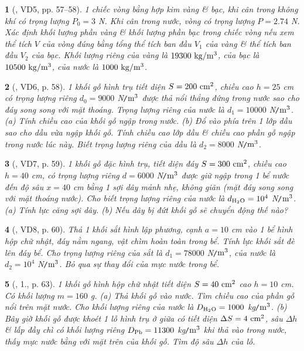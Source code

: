 \documentclass{article}
\newtheorem{baitoan}{}
\begin{document}
\begin{baitoan}[\cite{Van_Quyen_Hanh_Nhu_10_chuyen_Ly}, VD5, pp. 57--58]
	1 chiếc vòng bằng hợp kim vàng \& bạc, khi cân trong không khí có trọng lượng $P_0 = 3$ {\rm N}. Khi cân trong nước, vòng có trọng lượng $P = 2.74$ {\rm N}. Xác định khối lượng phần vàng \& khối lượng phần bạc trong chiếc vòng nếu xem thể tích $V$ của vòng đúng bằng tổng thể tích ban đầu $V_1$ của vàng \& thể tích ban đầu $V_2$ của bạc. Khối lượng riêng của vàng là $\rm19300\ kg{\tt/}m^3$, của bạc là $\rm10500\ kg{\tt/}m^3$, của nước là $\rm1000\ kg{\tt/}m^3$.
\end{baitoan}

\begin{baitoan}[\cite{Van_Quyen_Hanh_Nhu_10_chuyen_Ly}, VD6, p. 58]
	1 khối gỗ hình trụ tiết diện $S = 200\ {\rm cm^2}$, chiều cao $h = 25$ {\rm cm} có trọng lượng riêng $d_0 = 9000$ {\rm N{\tt/}$\rm m^3$} được thả nổi thẳng đứng trong nước sao cho đáy song song với mặt thoáng. Trọng lượng riêng của nước là $d_1 = 10000$ {\rm N{\tt/}$\rm m^3$}. (a) Tính chiều cao của khối gỗ ngập trong nước. (b) Đổ vào phía trên 1 lớp dầu sao cho dầu vừa ngập khối gỗ. Tính chiều cao lớp dầu \& chiều cao phần gỗ ngập trong nước lúc này. Biết trọng lượng riêng của dầu là $d_2 = 8000$ {\rm N{\tt/}$\rm m^3$}.
\end{baitoan}

\begin{baitoan}[\cite{Van_Quyen_Hanh_Nhu_10_chuyen_Ly}, VD7, p. 59]
	1 khối gỗ đặc hình trụ, tiết diện đáy $S = 300\ {\rm cm^2}$, chiều cao $h = 40$ {\rm cm}, có trọng lượng riêng $d = 6000$ {\rm N{\tt/}$\rm m^3$} được giữ ngập trong 1 bể nước đến độ sâu $x = 40$ {\rm cm} bằng 1 sợi dây mảnh nhẹ, không giãn (mặt đáy song song với mặt thoáng nước). Cho biết trọng lượng riêng của nước là $d_{\rm H_2O} = 10^4$ {\rm N{\tt/}$\rm m^3$}. (a) Tính lực căng sợi dây. (b) Nếu dây bị đứt khối gỗ sẽ chuyển động thế nào?
\end{baitoan}

\begin{baitoan}[\cite{Van_Quyen_Hanh_Nhu_10_chuyen_Ly}, VD8, p. 60]
	Thả 1 khối sắt hình lập phương, cạnh $a = 10$ {\rm cm} vào 1 bể hình hộp chữ nhật, đáy nằm ngang, vật chìm hoàn toàn trong bể. Tính lực khối sắt đè lên đáy bể. Cho trọng lượng riêng của sắt là $d_1 = 78000$ {\rm N{\tt/}$\rm m^3$}, của nước là $d_2 = 10^4$ {\rm N{\tt/}$\rm m^3$}. Bỏ qua sự thay đổi của mực nước trong bể.
\end{baitoan}

\begin{baitoan}[\cite{Van_Quyen_Hanh_Nhu_10_chuyen_Ly}, 1., p. 63]
	1 khối gỗ hình hộp chữ nhật tiết diện $S = 40\ {\rm cm}^2$ cao $h = 10$ {\rm cm}. Có khối lượng $m = 160$ {\rm g}. (a) Thả khối gỗ vào nước. Tìm chiều cao của phần gỗ nổi trên mặt nước. Cho khối lượng riêng của nước là $D_{\rm H_2O} = 1000$ {\rm kg{\tt/}$\rm m^3$}. (b) Bây giờ khối gỗ được khoét 1 lỗ hình trụ ở giữa có tiết diện $\Delta S = 4\ {\rm cm}^2$, sâu $\Delta h$ \& lấp đầy chì có khối lượng riêng $D_{\rm Pb} = 11300$ {\rm kg{\tt/}$\rm m^3$} khi thả vào trong nước, thấy mực nước bằng với mặt trên của khối gỗ. Tìm độ sâu $\Delta h$ của lỗ.
\end{baitoan}
\end{document}
